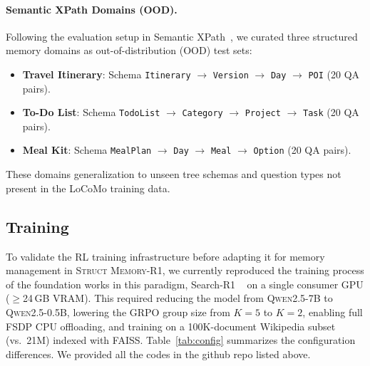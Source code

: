 \documentclass{article}
\theoremstyle{definition}
\begin{document}
\paragraph{Semantic XPath Domains (OOD).}
Following the evaluation setup in Semantic XPath~\citep{semanticxpath2026}, we curated three structured memory domains as out-of-distribution (OOD) test sets:
\begin{itemize}[nosep]
    \item \textbf{Travel Itinerary}: Schema \texttt{Itinerary} $\to$ \texttt{Version} $\to$ \texttt{Day} $\to$ \texttt{POI} (20 QA pairs).
    \item \textbf{To-Do List}: Schema \texttt{TodoList} $\to$ \texttt{Category} $\to$ \texttt{Project} $\to$ \texttt{Task} (20 QA pairs).
    \item \textbf{Meal Kit}: Schema \texttt{MealPlan} $\to$ \texttt{Day} $\to$ \texttt{Meal} $\to$ \texttt{Option} (20 QA pairs).
\end{itemize}
These domains generalization to unseen tree schemas and question types not present in the LoCoMo training data.



\subsection{Training}
To validate the RL training infrastructure before adapting it for memory management in \textsc{Struct Memory-R1}, we currently reproduced the training process of the foundation works in this paradigm, Search-R1 ~\citep{jin2025search} on a single consumer GPU ($\geq$24\,GB VRAM). This required reducing the model from \textsc{Qwen2.5-7B} to \textsc{Qwen2.5-0.5B}, lowering the GRPO group size from $K{=}5$ to $K{=}2$, enabling full FSDP CPU offloading, and training on a 100K-document Wikipedia subset (vs.\ 21M) indexed with FAISS. Table~\ref{tab:config} summarizes the configuration differences. We provided all the codes in the github repo listed above.
\end{document}
